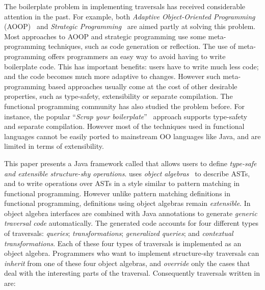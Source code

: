The boilerplate problem in implementing traversals has received
considerable attention in the past. For example, both \emph{Adaptive
  Object-Oriented Programming} (AOOP)~\cite{DemeterBook} and
\emph{Strategic Programming}~\cite{borovansky1996elan,visser1998core}
are aimed partly at solving this problem. Most approaches to AOOP and
strategic programming use some meta-programming techniques, such as
code generation or reflection. The use of meta-programming offers
programmers an easy way to avoid having to write boilerplate code.
This has important benefits: users have to write much less code; and 
the code becomes much more adaptive to changes.
However such meta-programming based approaches usually come at the cost of
other desirable properties, such as type-safety, extensibility or
separate compilation. The functional programming community has also
studied the problem before. For instance, the popular ``\emph{Scrap your
boilerplate}''~\cite{ralf03syb} approach supports type-safety and
separate compilation. However most of the techniques used in
functional languages cannot be easily ported to mainstream OO
languages like Java, and are limited in terms of extensibility.



This paper presents a Java framework called \name that allows users to
define \emph{type-safe and extensible structure-shy operations}. \name
uses \emph{object algebras}~\cite{bruno12oa} to describe ASTs, and to
write operations over ASTs in a style similar to pattern matching in
functional programming. However unlike pattern matching definitions in
functional programming, definitions using object algebras remain
\emph{extensible}. In \name object algebra interfaces are combined
with Java annotations to generate \emph{generic traversal code} automatically. The
generated code accounts for four different types of traversals:
\emph{queries}; \emph{transformations}; \emph{generalized queries};
and \emph{contextual transformations}.  Each of these four types of
traversals is implemented as an object algebra. Programmers who want
to implement structure-shy traversals can \emph{inherit} from one of these
four object algebras, and \emph{override} only the cases that deal with 
the interesting parts of the traversal. Consequently
traversals written in \name are:

